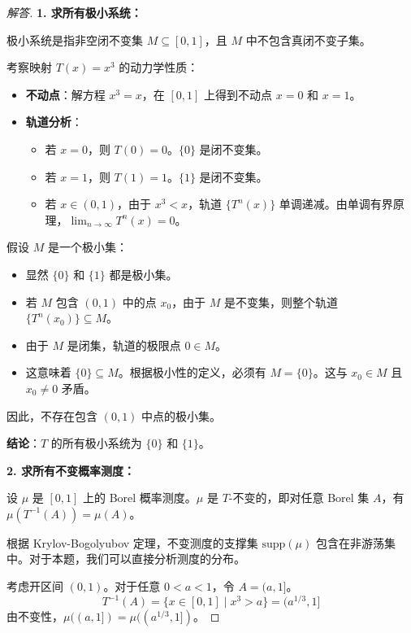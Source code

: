 \documentclass[a4paper,12pt]{article}
\newenvironment{solution}{\begin{proof}[解答]}{\end{proof}}
\begin{document}
\begin{solution}
    \textbf{1. 求所有极小系统：}
    
    极小系统是指非空闭不变集 $M \subseteq [0, 1]$，且 $M$ 中不包含真闭不变子集。
    
    考察映射 $T(x) = x^3$ 的动力学性质：
    \begin{itemize}
        \item \textbf{不动点}：解方程 $x^3 = x$，在 $[0, 1]$ 上得到不动点 $x=0$ 和 $x=1$。
        \item \textbf{轨道分析}：
        \begin{itemize}
            \item 若 $x=0$，则 $T(0)=0$。$\{0\}$ 是闭不变集。
            \item 若 $x=1$，则 $T(1)=1$。$\{1\}$ 是闭不变集。
            \item 若 $x \in (0, 1)$，由于 $x^3 < x$，轨道 $\{T^n(x)\}$ 单调递减。由单调有界原理，$\lim_{n\to\infty} T^n(x) = 0$。
        \end{itemize}
    \end{itemize}

    假设 $M$ 是一个极小集：
    \begin{itemize}
        \item 显然 $\{0\}$ 和 $\{1\}$ 都是极小集。
        \item 若 $M$ 包含 $(0, 1)$ 中的点 $x_0$，由于 $M$ 是不变集，则整个轨道 $\{T^n(x_0)\} \subseteq M$。
        \item 由于 $M$ 是闭集，轨道的极限点 $0 \in M$。
        \item 这意味着 $\{0\} \subseteq M$。根据极小性的定义，必须有 $M = \{0\}$。这与 $x_0 \in M$ 且 $x_0 \neq 0$ 矛盾。
    \end{itemize}
    因此，不存在包含 $(0, 1)$ 中点的极小集。
    
    \textbf{结论}：$T$ 的所有极小系统为 $\{0\}$ 和 $\{1\}$。

    \textbf{2. 求所有不变概率测度：}
    
    设 $\mu$ 是 $[0, 1]$ 上的 Borel 概率测度。$\mu$ 是 $T$-不变的，即对任意 Borel 集 $A$，有 $\mu(T^{-1}(A)) = \mu(A)$。
    
    根据 Krylov-Bogolyubov 定理，不变测度的支撑集 $\text{supp}(\mu)$ 包含在非游荡集中。对于本题，我们可以直接分析测度的分布。
    
    考虑开区间 $(0, 1)$。对于任意 $0 < a < 1$，令 $A = (a, 1]$。
    $$ T^{-1}(A) = \{x \in [0, 1] \mid x^3 > a\} = (a^{1/3}, 1] $$
    由不变性，$\mu((a, 1]) = \mu((a^{1/3}, 1])$。
    

\end{solution}
\end{document}
